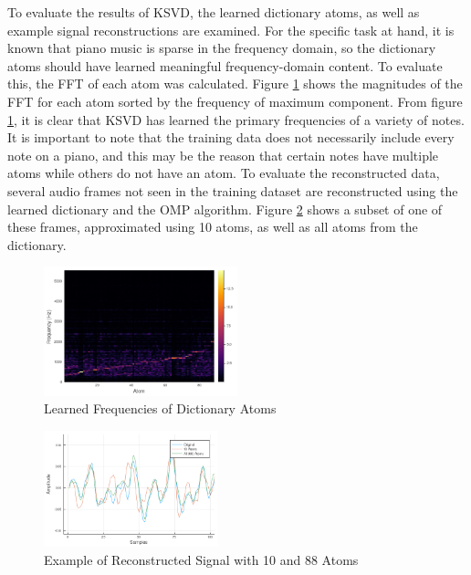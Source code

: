 To evaluate the results of KSVD, the learned dictionary atoms, as well as example signal reconstructions are examined. For the specific task at hand, it is known that piano music is sparse in the frequency domain, so the dictionary atoms should have learned meaningful frequency-domain content. To evaluate this, the \ac{FFT} of each atom was calculated. Figure \ref{fig:figs-atoms-png} shows the magnitudes of the \ac{FFT} for each atom sorted by the frequency of maximum component. From figure \ref{fig:figs-atoms-png}, it is clear that \ac{KSVD} has learned the primary frequencies of a variety of notes. It is important to note that the training data does not necessarily include every note on a piano, and this may be the reason that certain notes have multiple atoms while others do not have an atom. To evaluate the reconstructed data, several audio frames not seen in the training dataset are reconstructed using the learned dictionary and the \ac{OMP} algorithm. Figure \ref{fig:figs-reconstructed-png} shows a subset of one of these frames, approximated using 10 atoms, as well as all atoms from the dictionary.

\begin{figure}[h]
	\centering
	\includegraphics[width=0.5\textwidth]{figs/atoms.png}
	\caption{Learned Frequencies of Dictionary Atoms}
	\label{fig:figs-atoms-png}
\end{figure}

\begin{figure}[h]
	\centering
	\includegraphics[width=0.45\textwidth]{figs/reconstructed.png}
	\caption{Example of Reconstructed Signal with 10 and 88 Atoms}
	\label{fig:figs-reconstructed-png}
\end{figure}

